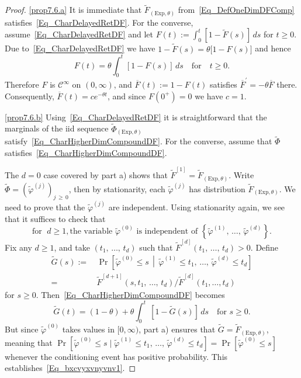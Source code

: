 \documentclass[10pt]{amsart}
\theoremstyle{definition}\newtheorem{defi}[theo]{Definition}\newtheorem{rema}[theo]{Remark}\newtheorem{exam}[theo]{Example}\newtheorem{exem}[theo]{Example}\newtheorem{nota}[theo]{Notation}
\newcommand{\clC}{\mathcal{C}}
\newcommand{\Expl}{\mathrm{Exp}}
\begin{document}
\pagebreak
\begin{proof}\leavevmode

\noindent\eqref{prop7.6.a} It is immediate that $\widetilde{F}_{(\Expl,\theta)}$ from~\eqref{Eq_DefOneDimDFComp} satisfies~\eqref{Eq_CharDelayedRetDF}. For the converse, assume~\eqref{Eq_CharDelayedRetDF} and let $F(t):= {\textstyle\int_{0}^{t}} [1-\widetilde{F}(s)]\,ds$ for $t\geq0$. Due to~\eqref{Eq_CharDelayedRetDF} we have $1-\widetilde{F}(s)=\theta\lbrack1-F(s)]$ and hence
\[
F(t)=\theta {\textstyle\int_{0}^{t}} [1-F(s)]\,ds\quad\text{for}\quad t\geq0.
\]
Therefore $F$ is $\clC^{\infty}$ on $(0,\infty)$, and $\overline {F}(t):=1-F(t)$ satisfies $\overline{F}^{\prime}=-\theta\overline{F}$ there. Consequently, $\overline{F}(t)=ce^{-\theta t}$, and since $F(0^{+})=0$ we have $c=1$.

\noindent\eqref{prop7.6.b}  Using~\eqref{Eq_CharDelayedRetDF} it is straightforward that the marginals of the iid sequence $\widetilde{\Phi }_{(\Expl,\theta)}$ satisfy~\eqref{Eq_CharHigherDimCompoundDF}. For the converse, assume that $\widetilde{\Phi}$ satisfies~\eqref{Eq_CharHigherDimCompoundDF}.

The $d=0$ case covered by part a) shows that $\widetilde{F}^{[1]} =\widetilde{F}_{(\Expl,\theta)}$. Write $\widetilde{\Phi} =(\widetilde{\varphi}^{(j)})_{j\,\geq\,0}$, then by stationarity, each $\widetilde{\varphi}^{(j)}$ has distribution $\widetilde{F}_{(\Expl,\theta)}$. We need to prove that the $\widetilde{\varphi}^{(j)}$ are independent. Using stationarity again, we see that it suffices to check that
\begin{equation}\label{Eq_bxcvyxvnyvnv1}
\text{for }\;d\geq1, \text{the variable }\widetilde{\varphi}^{(0)}\text{ is independent of }\left\{\widetilde{\varphi}^{(1)},\,\ldots,\,\widetilde{\varphi} ^{(d)}\right\}. 
\end{equation}
Fix any $d\geq1$, and take $(t_{1},\,\ldots,\,t_{d})$ such that $\widetilde {F}^{[d]}(t_{1},\,\ldots,\,t_{d})>0$. Define
\begin{align*}
\widetilde{G}(s)  :=& \,\Pr\left[\widetilde{\varphi}^{(0)}\leq s\,\middle|\,\widetilde {\varphi}^{(1)}\leq t_{1},\,\ldots,\,\widetilde{\varphi}^{(d)}\leq t_{d}\right]\\
 =& \,\widetilde{F}^{[d+1]}\left(s,t_{1},\,\ldots,\,t_{d}\right)/\widetilde{F}^{[d]} \left(t_{1},\ldots,t_{d}\right)
\end{align*}
for $s\geq0$. Then~\eqref{Eq_CharHigherDimCompoundDF} becomes
\[
\widetilde{G}(t)=(1-\theta)+\theta {\textstyle\int_{0}^{t}}
\,\left[1-\widetilde{G}(s)\right]\,ds\quad \text{for }s\geq0.
\]
But since $\widetilde{\varphi}^{(0)}$ takes values in $[0,\infty)$, part a) ensures that $\widetilde{G}=\widetilde{F}_{(\Expl,\theta)}$, meaning that $\Pr[\widetilde{\varphi}^{(0)}\leq s\mid\widetilde{\varphi}^{(1)}\leq t_{1},\,\ldots,\,\widetilde{\varphi}^{(d)}\leq t_{d}]=\Pr[\widetilde{\varphi }^{(0)}\leq s]$ whenever the conditioning event has positive probability. This establishes~\eqref{Eq_bxcvyxvnyvnv1}.
\end{proof}
\end{document}

